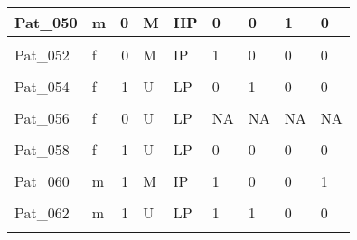 \documentclass[11pt, a4paper, twosided]{book}
\begin{document}
\begin{longtable}[t]{l|l|r|l|l|l|l|l|l}
\hline
Pat\_050 & m & 0 & M & HP & 0 & 0 & 1 & 0\\
\hline
\cellcolor[HTML]{E2E868}{Pat\_051} & \cellcolor[HTML]{E2E868}{m} & \cellcolor[HTML]{E2E868}{0} & \cellcolor[HTML]{E2E868}{M} & \cellcolor[HTML]{E2E868}{NA} & \cellcolor[HTML]{E2E868}{1} & \cellcolor[HTML]{E2E868}{0} & \cellcolor[HTML]{E2E868}{0} & \cellcolor[HTML]{E2E868}{0}\\
\hline
Pat\_052 & f & 0 & M & IP & 1 & 0 & 0 & 0\\
\hline
\cellcolor[HTML]{E2E868}{Pat\_053} & \cellcolor[HTML]{E2E868}{m} & \cellcolor[HTML]{E2E868}{1} & \cellcolor[HTML]{E2E868}{U} & \cellcolor[HTML]{E2E868}{LP} & \cellcolor[HTML]{E2E868}{1} & \cellcolor[HTML]{E2E868}{1} & \cellcolor[HTML]{E2E868}{0} & \cellcolor[HTML]{E2E868}{0}\\
\hline
Pat\_054 & f & 1 & U & LP & 0 & 1 & 0 & 0\\
\hline
\cellcolor[HTML]{E2E868}{Pat\_055} & \cellcolor[HTML]{E2E868}{m} & \cellcolor[HTML]{E2E868}{1} & \cellcolor[HTML]{E2E868}{U} & \cellcolor[HTML]{E2E868}{LP} & \cellcolor[HTML]{E2E868}{0} & \cellcolor[HTML]{E2E868}{0} & \cellcolor[HTML]{E2E868}{0} & \cellcolor[HTML]{E2E868}{0}\\
\hline
Pat\_056 & f & 0 & U & LP & NA & NA & NA & NA\\
\hline
\cellcolor[HTML]{E2E868}{Pat\_057} & \cellcolor[HTML]{E2E868}{f} & \cellcolor[HTML]{E2E868}{0} & \cellcolor[HTML]{E2E868}{M} & \cellcolor[HTML]{E2E868}{HP} & \cellcolor[HTML]{E2E868}{1} & \cellcolor[HTML]{E2E868}{0} & \cellcolor[HTML]{E2E868}{1} & \cellcolor[HTML]{E2E868}{0}\\
\hline
Pat\_058 & f & 1 & U & LP & 0 & 0 & 0 & 0\\
\hline
\cellcolor[HTML]{E2E868}{Pat\_059} & \cellcolor[HTML]{E2E868}{m} & \cellcolor[HTML]{E2E868}{0} & \cellcolor[HTML]{E2E868}{M} & \cellcolor[HTML]{E2E868}{HP} & \cellcolor[HTML]{E2E868}{1} & \cellcolor[HTML]{E2E868}{0} & \cellcolor[HTML]{E2E868}{0} & \cellcolor[HTML]{E2E868}{0}\\
\hline
Pat\_060 & m & 1 & M & IP & 1 & 0 & 0 & 1\\
\hline
\cellcolor[HTML]{E2E868}{Pat\_061} & \cellcolor[HTML]{E2E868}{m} & \cellcolor[HTML]{E2E868}{0} & \cellcolor[HTML]{E2E868}{U} & \cellcolor[HTML]{E2E868}{LP} & \cellcolor[HTML]{E2E868}{0} & \cellcolor[HTML]{E2E868}{0} & \cellcolor[HTML]{E2E868}{1} & \cellcolor[HTML]{E2E868}{0}\\
\hline
Pat\_062 & m & 1 & U & LP & 1 & 1 & 0 & 0\\
\hline
\cellcolor[HTML]{E2E868}{Pat\_063} & \cellcolor[HTML]{E2E868}{f} & \cellcolor[HTML]{E2E868}{0} & \cellcolor[HTML]{E2E868}{U} & \cellcolor[HTML]{E2E868}{LP} & \cellcolor[HTML]{E2E868}{1} & \cellcolor[HTML]{E2E868}{0} & \cellcolor[HTML]{E2E868}{0} & \cellcolor[HTML]{E2E868}{0}\\

\end{longtable}
\end{document}
